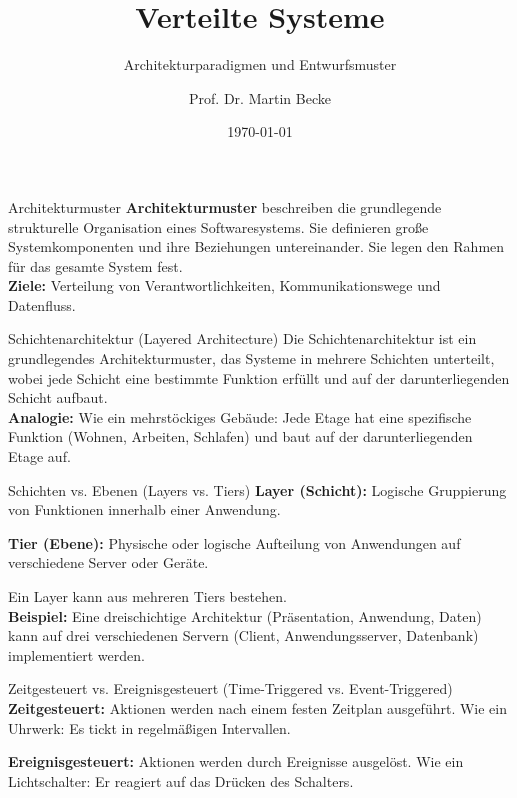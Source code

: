 \documentclass{beamer}
\title{Verteilte Systeme}
\subtitle{Architekturparadigmen und Entwurfsmuster}
\author{Prof. Dr. Martin Becke}
\date{\today}
\begin{document}
\begin{frame}
    \titlepage
\end{frame}


\begin{frame}{Architekturmuster}
    \textbf{Architekturmuster} beschreiben die grundlegende strukturelle Organisation eines Softwaresystems. Sie definieren große Systemkomponenten und ihre Beziehungen untereinander. Sie legen den Rahmen für das gesamte System fest.
    \\
    \textbf{Ziele:} Verteilung von Verantwortlichkeiten, Kommunikationswege und Datenfluss.
\end{frame}
\begin{frame}{Schichtenarchitektur (Layered Architecture)}
    Die Schichtenarchitektur ist ein grundlegendes Architekturmuster, das Systeme in mehrere Schichten unterteilt, wobei jede Schicht eine bestimmte Funktion erfüllt und auf der darunterliegenden Schicht aufbaut.  
\mbox{}\\
    \textbf{Analogie:} Wie ein mehrstöckiges Gebäude: Jede Etage hat eine spezifische Funktion (Wohnen, Arbeiten, Schlafen) und baut auf der darunterliegenden Etage auf.
\end{frame}


\begin{frame}{Schichten vs. Ebenen (Layers vs. Tiers)}
    \textbf{Layer (Schicht):} Logische Gruppierung von Funktionen innerhalb einer Anwendung.

    \textbf{Tier (Ebene):}  Physische oder logische Aufteilung von Anwendungen auf verschiedene Server oder Geräte.

    Ein Layer kann aus mehreren Tiers bestehen.  
    \mbox{}\\
    \textbf{Beispiel:} Eine dreischichtige Architektur (Präsentation, Anwendung, Daten) kann auf drei verschiedenen Servern (Client, Anwendungsserver, Datenbank) implementiert werden.
\end{frame}

\begin{frame}{Zeitgesteuert vs. Ereignisgesteuert (Time-Triggered vs. Event-Triggered)}
    \textbf{Zeitgesteuert:} Aktionen werden nach einem festen Zeitplan ausgeführt. Wie ein Uhrwerk:  Es tickt in regelmäßigen Intervallen.

    \textbf{Ereignisgesteuert:}  Aktionen werden durch Ereignisse ausgelöst. Wie ein Lichtschalter:  Er reagiert auf das Drücken des Schalters.
\end{frame}
\end{document}
